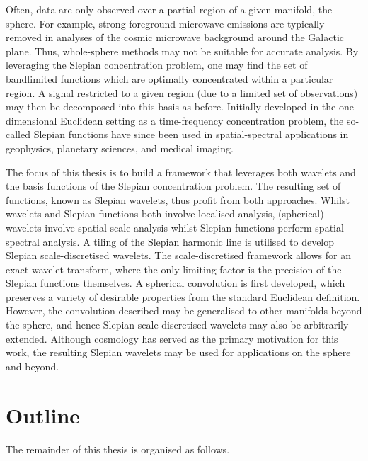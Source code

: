 Often, data are only observed over a partial region of a given manifold, \ie{} the sphere.
For example, strong foreground microwave emissions are typically removed in analyses of the cosmic microwave background around the Galactic plane.
Thus, whole-sphere methods may not be suitable for accurate analysis.
By leveraging the Slepian concentration problem, one may find the set of bandlimited functions which are optimally concentrated within a particular region.
A signal restricted to a given region (due to a limited set of observations) may then be decomposed into this basis as before.
Initially developed in the one-dimensional Euclidean setting as a time-frequency concentration problem, the so-called Slepian functions have since been used in spatial-spectral applications in geophysics, planetary sciences, and medical imaging.

The focus of this thesis is to build a framework that leverages both wavelets and the basis functions of the Slepian concentration problem.
The resulting set of functions, known as Slepian wavelets, thus profit from both approaches.
Whilst wavelets and Slepian functions both involve localised analysis, (spherical) wavelets involve spatial-scale analysis whilst Slepian functions perform spatial-spectral analysis.
A tiling of the Slepian harmonic line is utilised to develop Slepian scale-discretised wavelets.
The scale-discretised framework allows for an exact wavelet transform, where the only limiting factor is the precision of the Slepian functions themselves.
A spherical convolution is first developed, which preserves a variety of desirable properties from the standard Euclidean definition.
However, the convolution described may be generalised to other manifolds beyond the sphere, and hence Slepian scale-discretised wavelets may also be arbitrarily extended.
Although cosmology has served as the primary motivation for this work, the resulting Slepian wavelets may be used for applications on the sphere and beyond.

\section{Outline}

The remainder of this thesis is organised as follows.

